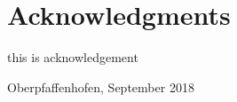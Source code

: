 \chapter*{Acknowledgments}

this is acknowledgement

\vspace{24pt}

\begin{flushright}
Oberpfaffenhofen, September 2018

\end{flushright}
